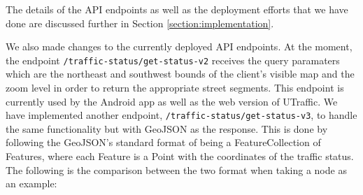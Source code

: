 The details of the API endpoints as well as the deployment efforts that we have done are discussed further in Section \ref{section:implementation}.

We also made changes to the currently deployed API endpoints. At the moment, the endpoint \lstinline{/traffic-status/get-status-v2} receives the query paramaters which are the northeast and southwest bounds of the client's visible map and the zoom level in order to return the appropriate street segments. This endpoint is currently used by the Android app as well as the web version of UTraffic. We have implemented another endpoint, \lstinline{/traffic-status/get-status-v3}, to handle the same functionality but with GeoJSON as the response. This is done by following the GeoJSON's standard format of being a FeatureCollection of Features, where each Feature is a Point with the coordinates of the traffic status. The following is the comparison between the two format when taking a node as an example:
